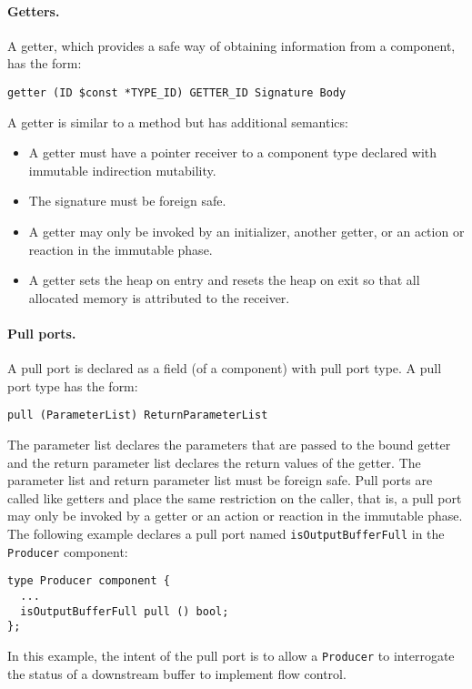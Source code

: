 \paragraph{Getters.}
A getter, which provides a safe way of obtaining information from a component, has the form:
\begin{verbatim}
getter (ID $const *TYPE_ID) GETTER_ID Signature Body
\end{verbatim}
A getter is similar to a method but has additional semantics:
\begin{itemize}
\item A getter must have a pointer receiver to a component type declared with immutable indirection mutability.
\item The signature must be foreign safe.
\item A getter may only be invoked by an initializer, another getter, or an action or reaction in the immutable phase.
\item A getter sets the heap on entry and resets the heap on exit so that all allocated memory is attributed to the receiver.
\end{itemize}

\paragraph{Pull ports.}
A pull port is declared as a field (of a component) with pull port type.
A pull port type has the form:
\begin{verbatim}
pull (ParameterList) ReturnParameterList
\end{verbatim}
The parameter list declares the parameters that are passed to the bound getter and the return parameter list declares the return values of the getter.
The parameter list and return parameter list must be foreign safe.
Pull ports are called like getters and place the same restriction on the caller, that is, a pull port may only be invoked by a getter or an action or reaction in the immutable phase.
The following example declares a pull port named \verb+isOutputBufferFull+ in the \verb+Producer+ component:
\begin{verbatim}
type Producer component {
  ...
  isOutputBufferFull pull () bool;
};
\end{verbatim}
In this example, the intent of the pull port is to allow a \verb+Producer+ to interrogate the status of a downstream buffer to implement flow control.

